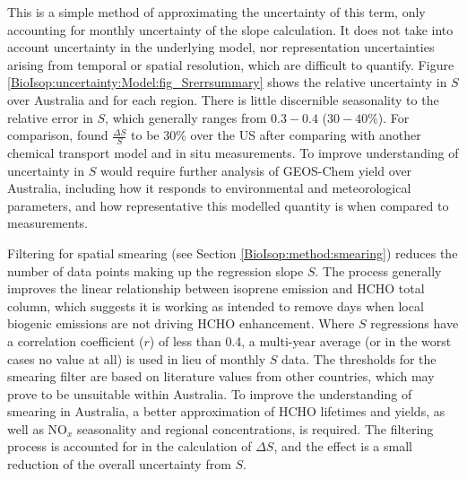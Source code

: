     
    This is a simple method of approximating the uncertainty of this term, only accounting for monthly uncertainty of the slope calculation.
    It does not take into account uncertainty in the underlying model, nor representation uncertainties arising from temporal or spatial resolution, which are difficult to quantify.
    Figure \ref{BioIsop:uncertainty:Model:fig_Srerrsummary} shows the relative uncertainty in $S$ over Australia and for each region.
    There is little discernible seasonality to the relative error in $S$, which generally ranges from $0.3-0.4$ ($30-40\%$).
    For comparison, \textcite{Palmer2006} found $\frac{\Delta S}{S}$ to be 30\% over the US after comparing with another chemical transport model and in situ measurements.
    To improve understanding of uncertainty in $S$ would require further analysis of GEOS-Chem yield over Australia, including how it responds to environmental and meteorological parameters, and how representative this modelled quantity is when compared to measurements.
    
    
    Filtering for spatial smearing (see Section \ref{BioIsop:method:smearing}) reduces the number of data points making up the regression slope $S$. 
    The process generally improves the linear relationship between isoprene emission and HCHO total column, which suggests it is working as intended to remove days when local biogenic emissions are not driving HCHO enhancement.
    Where $S$ regressions have a correlation coefficient ($r$) of less than 0.4, a multi-year average (or in the worst cases no value at all) is used in lieu of monthly $S$ data.
    The thresholds for the smearing filter are based on literature values from other countries, which may prove to be unsuitable within Australia.
    To improve the understanding of smearing in Australia, a better approximation of HCHO lifetimes and yields, as well as NO$_x$ seasonality and regional concentrations, is required.
    The filtering process is accounted for in the calculation of $\Delta S$, and the effect is a small reduction of the overall uncertainty from $S$.
    
    

